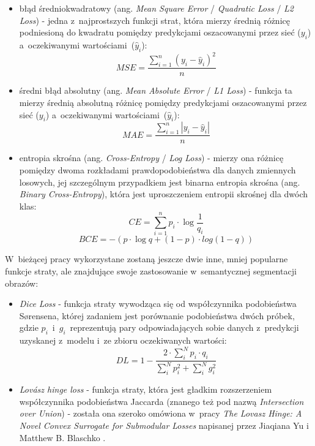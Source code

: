 \begin{itemize}
\item błąd średniokwadratowy (ang. \emph{Mean Square Error} / \emph{Quadratic Loss} / \emph{L2 Loss}) - jedna z~najprostszych funkcji strat, która mierzy średnią różnicę podniesioną do kwadratu pomiędzy predykcjami oszacowanymi przez sieć ($y_i$) a~oczekiwanymi wartościami~($\hat{y}_i$):
 \begin{equation}
MSE = \frac{\sum_{i=1}^{n}(y_i - \hat{y}_i)^2}{n}
\end{equation}
\item średni błąd absolutny (ang. \emph{Mean Absolute Error} / \emph{L1 Loss}) - funkcja ta mierzy średnią absolutną różnicę pomiędzy predykcjami oszacowanymi przez sieć ($y_i$) a~oczekiwanymi wartościami~($\hat{y}_i$):
 \begin{equation}
MAE = \frac{\sum_{i=1}^{n}|y_i - \hat{y}_i|}{n}
\end{equation}
\item entropia skrośna (ang. \emph{Cross-Entropy} / \emph{Log Loss}) - mierzy ona różnicę pomiędzy dwoma rozkładami prawdopodobieństwa dla danych zmiennych losowych, jej szczególnym przypadkiem jest binarna entropia skrośna (ang. \emph{Binary Cross-Entropy}), która jest uproszczeniem entropii skrośnej dla dwóch klas:
 \begin{equation}
CE = \sum_{i=1}^{n}p_i\cdot \log{\frac{1}{q_i}}
\end{equation}
\begin{equation}
BCE = -(p \cdot \log{q} + (1-p) \cdot log(1-q))
\end{equation}
\end{itemize}

W~bieżącej pracy wykorzystane zostaną jeszcze dwie inne, mniej popularne funkcje straty, ale znajdujące swoje zastosowanie w~semantycznej segmentacji obrazów:
\begin{itemize}
\item \emph{Dice Loss} - funkcja straty wywodząca się od współczynnika podobieństwa Sørensena, której zadaniem jest porównanie podobieństwa dwóch próbek, gdzie $p_i$~i~$g_i$~reprezentują pary odpowiadających sobie danych z~predykcji uzyskanej z~modelu i~ze zbioru oczekiwanych wartości:
\begin{equation}
DL  = 1 -\frac{2 \cdot \sum_{i}^{N}p_i \cdot q_i}{\sum_{i}^{N}p_{i}^{2}+\sum_{i}^{N}g_{i}^{2}}
\end{equation}
\item \emph{Lovász hinge loss} - funkcja straty, która jest gładkim rozszerzeniem współczynnika podobieństwa Jaccarda (znanego też pod nazwą \emph{Intersection over Union}) - została ona szeroko omówiona w~pracy \emph{The Lovasz Hinge: A Novel Convex Surrogate for Submodular Losses} napisanej przez Jiaqiana Yu i Matthew B. Blaschko \cite{yu}.
\end{itemize}

